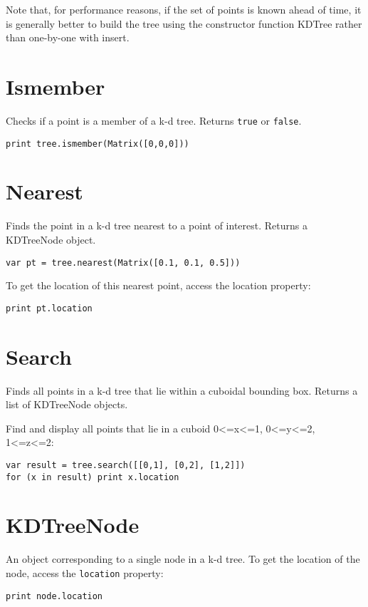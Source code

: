 Note that, for performance reasons, if the set of points is known ahead
of time, it is generally better to build the tree using the constructor
function KDTree rather than one-by-one with insert.

\hypertarget{ismember}{%
\section{Ismember}\label{ismember}}

Checks if a point is a member of a k-d tree. Returns \texttt{true} or
\texttt{false}.

\begin{lstlisting}
print tree.ismember(Matrix([0,0,0]))
\end{lstlisting}

\hypertarget{nearest}{%
\section{Nearest}\label{nearest}}

Finds the point in a k-d tree nearest to a point of interest. Returns a
KDTreeNode object.

\begin{lstlisting}
var pt = tree.nearest(Matrix([0.1, 0.1, 0.5]))
\end{lstlisting}

To get the location of this nearest point, access the location property:

\begin{lstlisting}
print pt.location
\end{lstlisting}

\hypertarget{search}{%
\section{Search}\label{search}}

Finds all points in a k-d tree that lie within a cuboidal bounding box.
Returns a list of KDTreeNode objects.

Find and display all points that lie in a cuboid
0\textless=x\textless=1, 0\textless=y\textless=2,
1\textless=z\textless=2:

\begin{lstlisting}
var result = tree.search([[0,1], [0,2], [1,2]])
for (x in result) print x.location
\end{lstlisting}

\hypertarget{kdtreenode}{%
\section{KDTreeNode}\label{kdtreenode}}

An object corresponding to a single node in a k-d tree. To get the
location of the node, access the \texttt{location} property:

\begin{lstlisting}
print node.location
\end{lstlisting}
